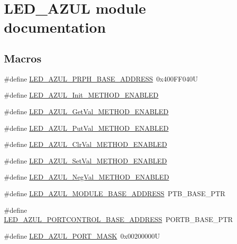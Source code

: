 \hypertarget{group___l_e_d___a_z_u_l__module}{}\section{L\+E\+D\+\_\+\+A\+Z\+UL module documentation}
\label{group___l_e_d___a_z_u_l__module}
\subsection*{Macros}
\begin{DoxyCompactItemize}
\item 
\#define \hyperlink{group___l_e_d___a_z_u_l__module_ga7d8f13cb339eab05df5c49fb6965562a}{L\+E\+D\+\_\+\+A\+Z\+U\+L\+\_\+\+P\+R\+P\+H\+\_\+\+B\+A\+S\+E\+\_\+\+A\+D\+D\+R\+E\+SS}~0x400\+F\+F040U
\item 
\#define \hyperlink{group___l_e_d___a_z_u_l__module_gae3985ba44a42fd929ca9b53cefa2cef2}{L\+E\+D\+\_\+\+A\+Z\+U\+L\+\_\+\+Init\+\_\+\+M\+E\+T\+H\+O\+D\+\_\+\+E\+N\+A\+B\+L\+ED}
\item 
\#define \hyperlink{group___l_e_d___a_z_u_l__module_ga6db5b0b5a40fc42b77c4df9327e206b4}{L\+E\+D\+\_\+\+A\+Z\+U\+L\+\_\+\+Get\+Val\+\_\+\+M\+E\+T\+H\+O\+D\+\_\+\+E\+N\+A\+B\+L\+ED}
\item 
\#define \hyperlink{group___l_e_d___a_z_u_l__module_ga29cc2c89697ced54804a37cdc39e7109}{L\+E\+D\+\_\+\+A\+Z\+U\+L\+\_\+\+Put\+Val\+\_\+\+M\+E\+T\+H\+O\+D\+\_\+\+E\+N\+A\+B\+L\+ED}
\item 
\#define \hyperlink{group___l_e_d___a_z_u_l__module_gaef1a8623908ea1d191f972cad5a6eb87}{L\+E\+D\+\_\+\+A\+Z\+U\+L\+\_\+\+Clr\+Val\+\_\+\+M\+E\+T\+H\+O\+D\+\_\+\+E\+N\+A\+B\+L\+ED}
\item 
\#define \hyperlink{group___l_e_d___a_z_u_l__module_ga177509261b014bc4722f28205377d856}{L\+E\+D\+\_\+\+A\+Z\+U\+L\+\_\+\+Set\+Val\+\_\+\+M\+E\+T\+H\+O\+D\+\_\+\+E\+N\+A\+B\+L\+ED}
\item 
\#define \hyperlink{group___l_e_d___a_z_u_l__module_ga11a5c402a601c0af4a49c97e4de8506d}{L\+E\+D\+\_\+\+A\+Z\+U\+L\+\_\+\+Neg\+Val\+\_\+\+M\+E\+T\+H\+O\+D\+\_\+\+E\+N\+A\+B\+L\+ED}
\item 
\#define \hyperlink{group___l_e_d___a_z_u_l__module_gaaaba183aa00d94ee298b32c77183cd61}{L\+E\+D\+\_\+\+A\+Z\+U\+L\+\_\+\+M\+O\+D\+U\+L\+E\+\_\+\+B\+A\+S\+E\+\_\+\+A\+D\+D\+R\+E\+SS}~P\+T\+B\+\_\+\+B\+A\+S\+E\+\_\+\+P\+TR
\item 
\#define \hyperlink{group___l_e_d___a_z_u_l__module_ga2383071b38065a5e66b896473172bd23}{L\+E\+D\+\_\+\+A\+Z\+U\+L\+\_\+\+P\+O\+R\+T\+C\+O\+N\+T\+R\+O\+L\+\_\+\+B\+A\+S\+E\+\_\+\+A\+D\+D\+R\+E\+SS}~P\+O\+R\+T\+B\+\_\+\+B\+A\+S\+E\+\_\+\+P\+TR
\item 
\#define \hyperlink{group___l_e_d___a_z_u_l__module_ga46c5ac529950e940484ca896a4abdeea}{L\+E\+D\+\_\+\+A\+Z\+U\+L\+\_\+\+P\+O\+R\+T\+\_\+\+M\+A\+SK}~0x00200000U
\end{DoxyCompactItemize}
